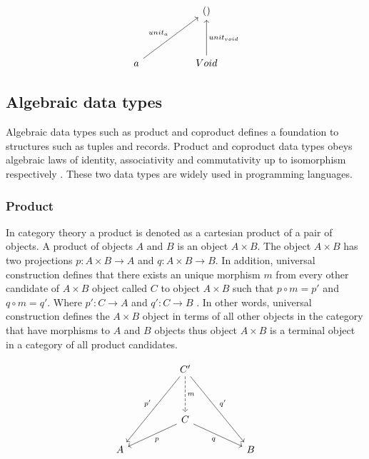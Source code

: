 \documentclass[article]{aaltoseries}
\begin{document}
    \begin{equation}
      \label{terminal}
      \begin{tikzcd}[row sep=huge, column sep=huge]
        & () \\
        a \arrow[ur, "unit_a"]
        & Void \arrow[u, "unit_{void}"']
      \end{tikzcd}
    \end{equation}
   

  \subsection{Algebraic data types}
    Algebraic data types such as product and coproduct defines a foundation to
    structures such as tuples and records. Product and coproduct data types
    obeys algebraic laws of identity, associativity and commutativity up to
    isomorphism respectively \cite{barr1990category}. These two data types are
    widely used in programming languages.


  \subsubsection{Product}
    In category theory a product is denoted as a cartesian product of a pair of
    objects. A product of objects $A$ and $B$ is an object $A \times B$. The
    object $A \times B$ has two projections $p : A \times B \rightarrow A$ and
    $q : A \times B \rightarrow B$. In addition, universal construction defines
    that there exists an unique morphism $m$ from every other candidate of $A
    \times B$ object called $C$ to object $A \times B$ such that $p \circ m =
    p'$ and $q \circ m = q'$. Where $p' : C \rightarrow A$ and $q' : C
    \rightarrow B$ \cite{barr1990category, pierce1991basic}. In other words,
    universal construction defines the $A \times B$ object in terms of all other
    objects in the category that have morphisms to $A$ and $B$ objects thus
    object $A \times B$ is a terminal object in a category of all product candidates.  

    \begin{equation}
      \label{product}
      \begin{tikzcd}[row sep=huge, column sep=huge]
        & C' \arrow[d, dashed, "m"]
        \arrow[ddl, "p'"']
        \arrow[ddr, "q'"]
        & \\
        & C \arrow[dl, "p"]
        \arrow[dr, "q"']
        & \\
        [-2em] A
        &
        & B
      \end{tikzcd}
    \end{equation}
\end{document}
